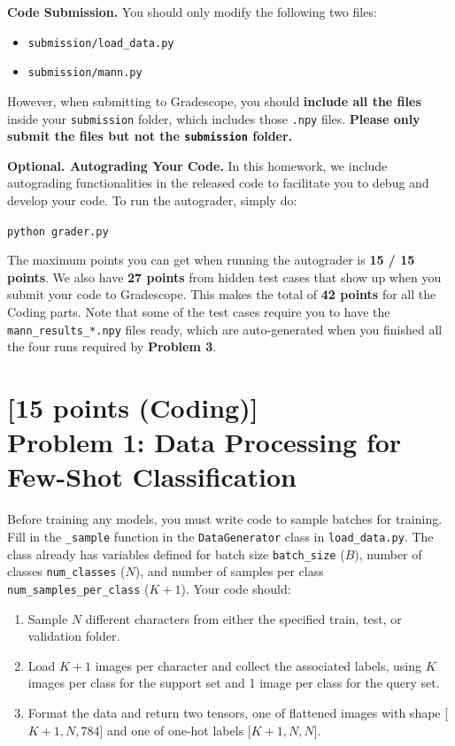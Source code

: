 \documentclass[12pt]{article}
\begin{document}
\vspace{0.2cm}
\noindent\textbf{Code Submission.}
You should only modify the following two files:
\begin{itemize}
    \item \texttt{submission/load\_data.py}
    \item \texttt{submission/mann.py}
\end{itemize}
However, when submitting to Gradescope, you should \textbf{include all the files} inside your \texttt{submission} folder, which includes those \texttt{.npy} files. \textbf{Please only submit the files but not the \texttt{submission} folder.}

\vspace{0.2cm}
\noindent\textbf{Optional. Autograding Your Code.}
In this homework, we include autograding functionalities in the released code to facilitate you to debug and develop your code. To run the autograder, simply do:

\texttt{python grader.py}

\noindent The maximum points you can get when running the autograder is \textbf{15 / 15 points}. We also have \textbf{27 points} from hidden test cases that show up when you submit your code to Gradescope. This makes the total of \textbf{42 points} for all the Coding parts. Note that some of the test cases require you to have the \texttt{mann\_results\_*.npy} files ready, which are auto-generated when you finished all the four runs required by \textbf{Problem 3}.



\section*{[15 points (Coding)]\\Problem 1: Data Processing for Few-Shot Classification}

Before training any models, you must write code to sample batches for training. Fill in the \texttt{\_sample} function in the \texttt{DataGenerator} class in \texttt{load\_data.py}. The class already has variables defined for batch size \texttt{batch\_size} ($B$), number of classes \texttt{num\_classes} ($N$), and number of samples per class \texttt{num\_samples\_per\_class} ($K+1$). Your code should:
\begin{enumerate}
    \item Sample $N$ different characters from either the specified train, test, or validation folder.
    \item Load $K+1$ images per character and collect the associated labels, using $K$ images per class for the support set and 1 image per class for the query set.
    \item Format the data and return two tensors, one of flattened images with shape [$K+1, N, 784$] and one of one-hot labels [$K+1, N, N$].
\end{enumerate}  
\end{document}
